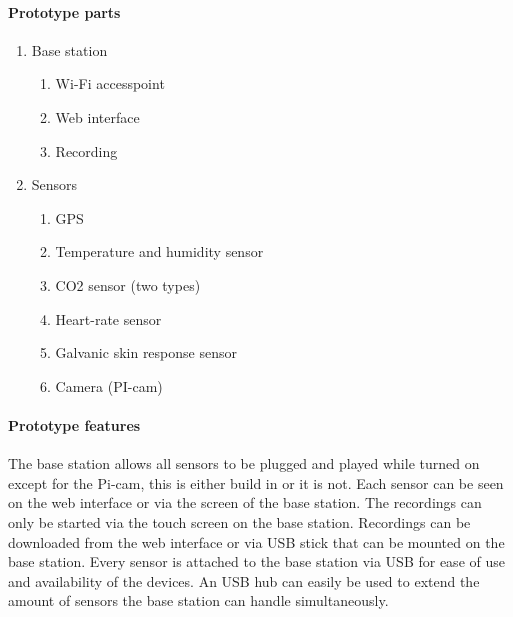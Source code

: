 \documentclass[conference]{IEEEtran}
\begin{document}
			\paragraph{Prototype parts}
				\begin{enumerate}
					\item Base station
						\begin{enumerate}
							\item Wi-Fi accesspoint
							\item Web interface
							\item Recording
						\end{enumerate}
					\item Sensors
						\begin{enumerate}
							\item GPS
							\item Temperature and humidity sensor
							\item CO2 sensor (two types)
							\item Heart-rate sensor
							\item Galvanic skin response sensor
							\item Camera (PI-cam)
						\end{enumerate}
				\end{enumerate}
			\paragraph{Prototype features}
				The base station allows all sensors to be plugged and played while turned on except for the Pi-cam, this is either build in or it is not. Each sensor can be seen on the web interface or via the screen of the base station. The recordings can only be started via the touch screen on the base station. Recordings can be downloaded from the web interface or via USB stick that can be mounted on the base station. Every sensor is attached to the base station via USB for ease of use and availability of the devices. An USB hub can easily be used to extend the amount of sensors the base station can handle simultaneously. 
\end{document}
